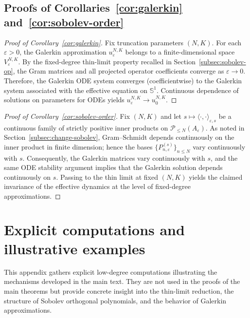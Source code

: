 \documentclass[11pt]{amsart}
\theoremstyle{plain}
\theoremstyle{definition}
\theoremstyle{remark}
\theoremstyle{remark}
\begin{document}
\subsection{Proofs of Corollaries~\ref{cor:galerkin} and~\ref{cor:sobolev-order}}

\begin{proof}[Proof of Corollary~\ref{cor:galerkin}]
Fix truncation parameters \((N,K)\).
For each \(\varepsilon>0\), the Galerkin approximation \(u_\varepsilon^{N,K}\)
belongs to a finite-dimensional space \(V_\varepsilon^{N,K}\).
By the fixed-degree thin-limit property recalled in
Section~\ref{subsec:sobolev-op}, the Gram matrices and all projected operator
coefficients converge as \(\varepsilon\to0\).
Therefore, the Galerkin ODE system converges (coefficientwise) to the Galerkin
system associated with the effective equation on \(\mathbb S^1\).
Continuous dependence of solutions on parameters for ODEs yields
\(u_\varepsilon^{N,K}\to u_0^{N,K}\).
\end{proof}

\begin{proof}[Proof of Corollary~\ref{cor:sobolev-order}]
Fix \((N,K)\) and let \(s\mapsto \langle\cdot,\cdot\rangle_{\varepsilon,s}\) be a
continuous family of strictly positive inner products on
\(\mathcal P_{\le N}(A_\varepsilon)\).
As noted in Section~\ref{subsec:change-sobolev}, Gram--Schmidt depends
continuously on the inner product in finite dimension; hence the bases
\(\{P_{n,\varepsilon}^{(s)}\}_{n\le N}\) vary continuously with \(s\).
Consequently, the Galerkin matrices vary continuously with \(s\), and the same
ODE stability argument implies that the Galerkin solution depends continuously on
\(s\).
Passing to the thin limit at fixed \((N,K)\) yields the claimed invariance of the
effective dynamics at the level of fixed-degree approximations.
\end{proof}

\appendix

\section{Explicit computations and illustrative examples}
\label{app:explicit}

This appendix gathers explicit low-degree computations illustrating the
mechanisms developed in the main text.
They are not used in the proofs of the main theorems but provide concrete insight
into the thin-limit reduction, the structure of Sobolev orthogonal polynomials,
and the behavior of Galerkin approximations.
\end{document}
